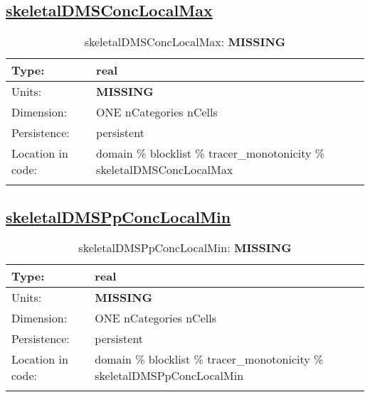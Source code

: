 \subsection[skeletalDMSConcLocalMax]{\hyperref[sec:var_tab_tracer_monotonicity]{skeletalDMSConcLocalMax}}
\label{subsec:var_sec_tracer_monotonicity_skeletalDMSConcLocalMax}
\begin{center}
\begin{longtable}{| p{2.0in} | p{4.0in} |}
        \hline 
        Type: & real \\
        \hline 
        Units: & {\bf \color{red} MISSING} \\
        \hline 
        Dimension: & ONE nCategories nCells \\
        \hline 
        Persistence: & persistent \\
        \hline 
         Location in code: & domain \% blocklist \% tracer\_monotonicity \% skeletalDMSConcLocalMax \\
         \hline 
    \caption{skeletalDMSConcLocalMax: {\bf \color{red} MISSING}}
\end{longtable}
\end{center}
\subsection[skeletalDMSPpConcLocalMin]{\hyperref[sec:var_tab_tracer_monotonicity]{skeletalDMSPpConcLocalMin}}
\label{subsec:var_sec_tracer_monotonicity_skeletalDMSPpConcLocalMin}
\begin{center}
\begin{longtable}{| p{2.0in} | p{4.0in} |}
        \hline 
        Type: & real \\
        \hline 
        Units: & {\bf \color{red} MISSING} \\
        \hline 
        Dimension: & ONE nCategories nCells \\
        \hline 
        Persistence: & persistent \\
        \hline 
         Location in code: & domain \% blocklist \% tracer\_monotonicity \% skeletalDMSPpConcLocalMin \\
         \hline 
    \caption{skeletalDMSPpConcLocalMin: {\bf \color{red} MISSING}}
\end{longtable}
\end{center}
